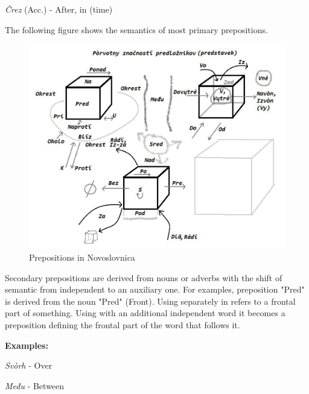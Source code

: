\textit{Črez} (Acc.) - After,  in (time)

The following figure shows the semantics of most primary prepositions.

\begin{figure}
	\includegraphics[width=\linewidth]{./sources/prepositions.jpeg}
	\caption{Prepositions in Novoslovnica}
	\label{fig:prepositions}
\end{figure}

Secondary prepositions are derived from nouns or adverbs with the shift of semantic from independent to an auxiliary one. For examples, preposition "Pred" is derived from the noun "Pred" (Front). Using separately in refers to a frontal part of something. Using with an additional independent word it becomes a preposition defining the frontal part of the word that follows it.

\textbf{Examples:}

\textit{Svòrh} - Over

\textit{Među} - Between